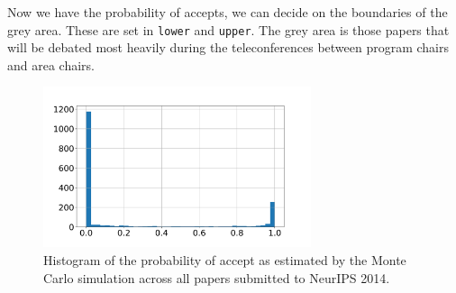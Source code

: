 Now we have the probability of accepts, we can decide on the boundaries
of the grey area. These are set in \texttt{lower} and \texttt{upper}.
The grey area is those papers that will be debated most heavily during
the teleconferences between program chairs and area chairs.

\begin{Shaded}
\begin{Highlighting}[]
\OperatorTok{=}
\OperatorTok{=}
\OperatorTok{=}\OperatorTok{\textgreater{}}\OperatorTok{\&}\OperatorTok{\textless{}}
\NormalTok{(}\NormalTok{())}
\end{Highlighting}
\end{Shaded}

\begin{Shaded}
\begin{Highlighting}[]
\end{Highlighting}
\end{Shaded}

\begin{Shaded}
\begin{Highlighting}[]
\OperatorTok{=}\OperatorTok{=}
\NormalTok{(}\NormalTok{())}
\NormalTok{\_ }\OperatorTok{=}\OperatorTok{=}\OperatorTok{=}
\OperatorTok{=}\OperatorTok{=}\NormalTok{)}
\end{Highlighting}
\end{Shaded}

\begin{figure}[htb]
\includegraphics[width=0.70\textwidth]{diagrams/neurips/probability-of-accept.pdf}


\caption{Histogram of the probability of accept as estimated by the Monte Carlo simulation across all papers submitted to NeurIPS 2014.}
\label{probability-of-accept}
\end{figure}

